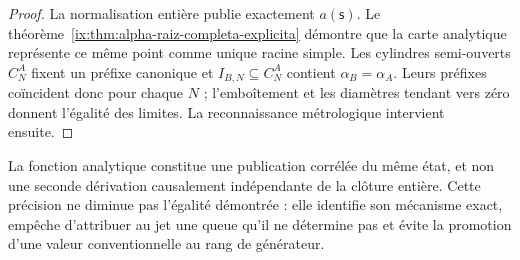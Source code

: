 \begin{proof}
La normalisation entière publie exactement \(a(\mathsf s)\). Le
théorème~\ref{ix:thm:alpha-raiz-completa-explicita} démontre que la carte
analytique représente ce même point comme unique racine simple. Les
cylindres semi-ouverts \(C_N^A\) fixent un préfixe canonique et
\(I_{B,N}\subseteq C_N^A\) contient \(\alpha_B=\alpha_A\). Leurs
préfixes coïncident donc pour chaque \(N\) ; l'emboîtement et les diamètres tendant vers
zéro donnent l'égalité des limites. La reconnaissance
métrologique intervient ensuite.
\end{proof}

La fonction analytique constitue une publication corrélée du même
état, et non une seconde dérivation causalement indépendante de la clôture
entière. Cette précision ne diminue pas l'égalité démontrée : elle identifie son
mécanisme exact, empêche d'attribuer au jet une queue qu'il ne détermine pas et évite la
promotion d'une valeur conventionnelle au rang de générateur.


\endinput

\subsubsection{Lecteur complet, naturalité et cylindres communs}

Soit \(F_{\mathsf s}\) le corps des coefficients de la signature de \(\mathsf s\in\mathcal X_\alpha^{\mathrm{enr}}\) et soit \(d_m=6+3m\). On définit
\[
 \mathfrak J_m:=\coprod_{\mathsf s\in\mathcal X_\alpha^{\mathrm{enr}}}
 \{\mathsf s\}\times F_{\mathsf s}[X]/(X^{d_m+1}),\qquad
 \Gamma_m(\mathsf s)=
 \bigl(\mathsf s,E_{21/22}^{(d_m)}(\mathsf s;X)\bigr).
\]
Le lecteur complet enregistré \(\Gamma_{E21}\) produit ces publications.
Pour \(m'\ge m\), la troncature
\(
 \tau_{m',m}(\mathsf s,[f]_{d_{m'}})
 =(\mathsf s,[f]_{d_m})
\)
satisfait
\begin{equation}
 \tau_{m',m}\circ\Gamma_{m'}=\Gamma_m,
 \qquad
 E_{21/22}:=\varprojlim_mE_{21/22}^{(d_m)}.
 \tag{A3}
 \label{ix:eq:alpha-sistema-analitico-completo}
\end{equation}
On n'ajoute pas de section de la troncature nue. Si l'on explicite la publication des trois coefficients suivants, celle-ci est la projection dérivée
\[
 \Lambda_{d_m+1:d_m+3}
 :=\operatorname{pr}_{d_m+1:d_m+3}\circ
   \Gamma_{E21}\circ\mathcal U_{\mathrm{TPK}},
\]
et non un générateur indépendant ni une lecture de la valeur cible.

